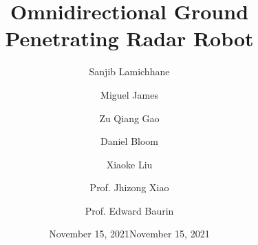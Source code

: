 

\date{November 15, 2021}
\title{Omnidirectional Ground Penetrating Radar Robot}

\author[1]{\large Sanjib Lamichhane}
\author[1]{\large Miguel James}
\author[1]{\large Zu Qiang Gao}
\author[1]{\large Daniel Bloom}
\author[1]{\large Xiaoke Liu}
\author{Prof. Jhizong Xiao}
\author{Prof. Edward Baurin}

\date{November 15, 2021}


